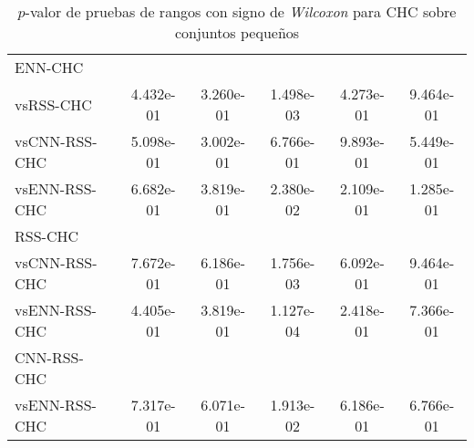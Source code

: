\begin{table}[h!]
\begin{adjustbox}{max width =\textwidth}
\begin{tabular}{l c c c c c}
\hline

ENN-CHC\\
vsRSS-CHC & 4.432e-01 & 3.260e-01 & 1.498e-03 & 4.273e-01 & 9.464e-01 \\ 
vsCNN-RSS-CHC & 5.098e-01 & 3.002e-01 & 6.766e-01 & 9.893e-01 & 5.449e-01 \\ 
vsENN-RSS-CHC & 6.682e-01 & 3.819e-01 & 2.380e-02 & 2.109e-01 & 1.285e-01 \\ 

\hline

RSS-CHC\\
vsCNN-RSS-CHC & 7.672e-01 & 6.186e-01 & 1.756e-03 & 6.092e-01 & 9.464e-01 \\ 
vsENN-RSS-CHC & 4.405e-01 & 3.819e-01 & 1.127e-04 & 2.418e-01 & 7.366e-01 \\ 

\hline

CNN-RSS-CHC\\
vsENN-RSS-CHC & 7.317e-01 & 6.071e-01 & 1.913e-02 & 6.186e-01 & 6.766e-01 \\ 

\hline 

\end{tabular}
\end{adjustbox}
\caption[Pruebas de \emph{Wilcoxon} entre CHC y variaciones para conjuntos pequeños]{$p$-valor de pruebas de rangos con signo de \emph{Wilcoxon} para CHC sobre conjuntos pequeños}
\label{wilcox-CHC-peq}
\end{table}


